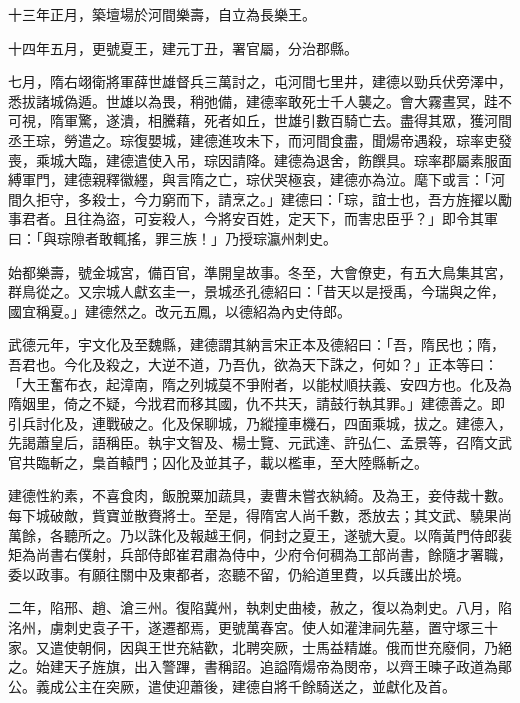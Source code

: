 \begin{pinyinscope}
 十三年正月，築壇場於河間樂壽，自立為長樂王。



 十四年五月，更號夏王，建元丁丑，署官屬，分治郡縣。



 七月，隋右翊衛將軍薛世雄督兵三萬討之，屯河間七里井，建德以勁兵伏旁澤中，悉拔諸城偽遁。世雄以為畏，稍弛備，建德率敢死士千人襲之。會大霧晝冥，跬不可視，隋軍驚，遂潰，相騰藉，死者如丘，世雄引數百騎亡去。盡得其眾，獲河間丞王琮，勞遣之。琮復嬰城，建德進攻未下，而河間食盡，聞煬帝遇殺，琮率吏發喪，乘城大臨，建德遣使入吊，琮因請降。建德為退舍，飭饌具。琮率郡屬素服面縛軍門，建德親釋徽纆，與言隋之亡，琮伏哭極哀，建德亦為泣。麾下或言：「河間久拒守，多殺士，今力窮而下，請烹之。」建德曰：「琮，誼士也，吾方旌擢以勵事君者。且往為盜，可妄殺人，今將安百姓，定天下，而害忠臣乎？」即令其軍曰：「與琮隙者敢輒搖，罪三族！」乃授琮瀛州刺史。



 始都樂壽，號金城宮，備百官，準開皇故事。冬至，大會僚吏，有五大鳥集其宮，群鳥從之。又宗城人獻玄圭一，景城丞孔德紹曰：「昔天以是授禹，今瑞與之侔，國宜稱夏。」建德然之。改元五鳳，以德紹為內史侍郎。



 武德元年，宇文化及至魏縣，建德謂其納言宋正本及德紹曰：「吾，隋民也；隋，吾君也。今化及殺之，大逆不道，乃吾仇，欲為天下誅之，何如？」正本等曰：「大王奮布衣，起漳南，隋之列城莫不爭附者，以能杖順扶義、安四方也。化及為隋姻里，倚之不疑，今戕君而移其國，仇不共天，請鼓行執其罪。」建德善之。即引兵討化及，連戰破之。化及保聊城，乃縱撞車機石，四面乘城，拔之。建德入，先謁蕭皇后，語稱臣。執宇文智及、楊士覽、元武達、許弘仁、孟景等，召隋文武官共臨斬之，梟首轅門；囚化及並其子，載以檻車，至大陸縣斬之。



 建德性約素，不喜食肉，飯脫粟加蔬具，妻曹未嘗衣紈綺。及為王，妾侍裁十數。每下城破敵，貲寶並散賚將士。至是，得隋宮人尚千數，悉放去；其文武、驍果尚萬餘，各聽所之。乃以誅化及報越王侗，侗封之夏王，遂號大夏。以隋黃門侍郎裴矩為尚書右僕射，兵部侍郎崔君肅為侍中，少府令何稠為工部尚書，餘隨才署職，委以政事。有願往關中及東都者，恣聽不留，仍給道里費，以兵護出於境。



 二年，陷邢、趙、滄三州。復陷冀州，執刺史曲棱，赦之，復以為刺史。八月，陷洺州，虜刺史袁子干，遂遷都焉，更號萬春宮。使人如灌津祠先墓，置守塚三十家。又遣使朝侗，因與王世充結歡，北聘突厥，士馬益精雄。俄而世充廢侗，乃絕之。始建天子旌旗，出入警蹕，書稱詔。追謚隋煬帝為閔帝，以齊王暕子政道為鄖公。義成公主在突厥，遣使迎蕭後，建德自將千餘騎送之，並獻化及首。




\end{pinyinscope}
